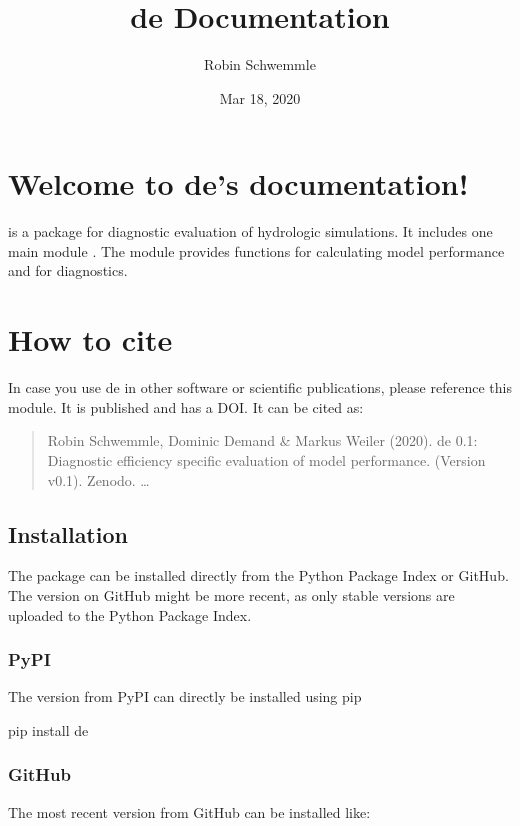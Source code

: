 \documentclass[letterpaper,10pt,english]{sphinxmanual}
\title{de Documentation}
\date{Mar 18, 2020}
\author{Robin Schwemmle}
\begin{document}
\pagestyle{empty}
\sphinxmaketitle
\pagestyle{plain}
\sphinxtableofcontents
\pagestyle{normal}
\label{\detokenize{index::doc}}



\chapter{Welcome to de’s documentation!}
\label{\detokenize{index:welcome-to-de-s-documentation}}
 is a package for diagnostic evaluation of hydrologic simulations. It
includes one main module . The module provides functions for calculating
model performance and for diagnostics.


\chapter{How to cite}
\label{\detokenize{index:how-to-cite}}
In case you use de in other software or scientific publications,
please reference this module. It is published and has a DOI. It can be cited
as:
\begin{quote}

Robin Schwemmle, Dominic Demand \& Markus Weiler (2020). de 0.1:
Diagnostic efficiency \textendash{} specific evaluation of model performance.
(Version v0.1). Zenodo. …
\end{quote}


\section{Installation}
\label{\detokenize{install:installation}}\label{\detokenize{install::doc}}
The package can be installed directly from the Python Package Index or GitHub.
The version on GitHub might be more recent, as only stable versions are
uploaded to the Python Package Index.


\subsection{PyPI}
\label{\detokenize{install:pypi}}
The version from PyPI can directly be installed using pip

\begin{sphinxVerbatim}[commandchars=\\\{\}]
pip install de
\end{sphinxVerbatim}


\subsection{GitHub}
\label{\detokenize{install:github}}
The most recent version from GitHub can be installed like:
\end{document}
